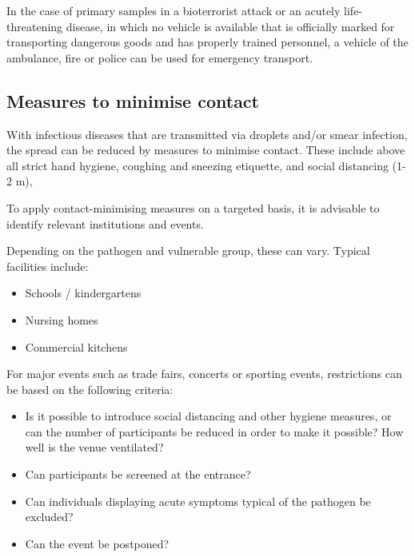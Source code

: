 \documentclass{article}
\begin{document}
In the case of primary samples in a bioterrorist attack or an acutely life-threatening disease, in which no vehicle is available that is officially marked for transporting dangerous goods and has properly trained personnel, a vehicle of the ambulance, fire or police can be used for emergency transport.


\subsection{Measures to minimise contact}\label{H7558141}



With infectious diseases that are transmitted via droplets and/or smear infection, the spread can be reduced by measures to minimise contact. These include above all strict hand hygiene, coughing and sneezing etiquette, and social distancing (1-2 m),


To apply contact-minimising measures on a targeted basis, it is advisable to identify relevant institutions and events.


Depending on the pathogen and vulnerable group, these can vary. Typical facilities include:

\begin{itemize}
\item Schools / kindergartens


\item Nursing homes


\item Commercial kitchens


\end{itemize}

For major events such as trade fairs, concerts or sporting events, restrictions can be based on the following criteria:

\begin{itemize}
\item Is it possible to introduce social distancing and other hygiene measures, or can the number of participants be reduced in order to make it possible? How well is the venue ventilated?


\item Can participants be screened at the entrance?


\item Can individuals displaying acute symptoms typical of the pathogen be excluded?


\item Can the event be postponed?


\end{itemize}
\end{document}
